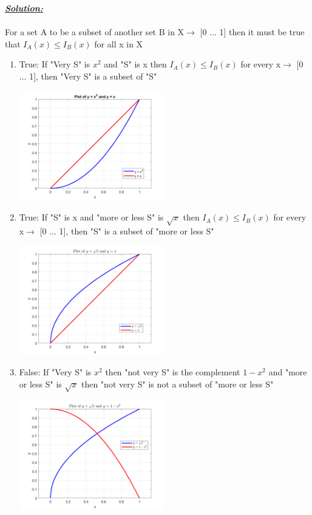 \documentclass{article}
\begin{document}
\noindent \underline{\textbf{\textit{Solution:}}}
\\ \\For a set A to be a subset of another set B in X${\rightarrow}$ [0 ... 1] then it must be true that  ${I_A(x) \leq I_B(x)}$  for all x in X
\begin{enumerate}
  \item True: If "Very S" is ${x^2}$ and "S" is x then ${I_A(x) \leq I_B(x)}$ for every x${\rightarrow}$ [0 ... 1], then "Very S" is a subset of "S"
  \\ \begin{center} \includegraphics[width=0.5\textwidth]{Problem11_1.png} \end{center}
  \item True: If "S" is x and "more or less S" is ${\sqrt{x}}$ then ${I_A(x) \leq I_B(x)}$ for every x${\rightarrow}$ [0 ... 1], then "S" is a subset of "more or less S"
  \\ \begin{center} \includegraphics[width=0.5\textwidth]{Problem11_2.png} \end{center}
  \item False: If "Very S" is ${x^2}$ then "not very S" is the complement ${1-x^2}$ and "more or less S" is ${\sqrt{x}}$ then "not very S" is not a subset of "more or less S"
  \\ \begin{center} \includegraphics[width=0.5\textwidth]{Problem11_3.png} \end{center} 

\end{enumerate}
\end{document}
